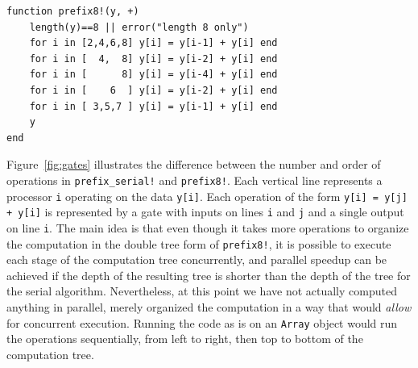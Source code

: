 \documentclass{sig-alternate}
\newcommand{\code}[1]{\texttt{#1}}
\begin{document}
\begin{verbatim}
function prefix8!(y, +)
    length(y)==8 || error("length 8 only")
    for i in [2,4,6,8] y[i] = y[i-1] + y[i] end
    for i in [  4,  8] y[i] = y[i-2] + y[i] end
    for i in [      8] y[i] = y[i-4] + y[i] end
    for i in [    6  ] y[i] = y[i-2] + y[i] end
    for i in [ 3,5,7 ] y[i] = y[i-1] + y[i] end
    y
end
\end{verbatim}

Figure~\ref{fig:gates} illustrates the difference between the number and order
of operations in \code{prefix\allowbreak\_serial!} and \code{prefix8!}. Each vertical line
represents a processor \code{i} operating on the data \code{y[i]}. Each
operation of the form \code{y[i] = y[j] + y[i]} is represented by a gate with
inputs on lines \code{i} and \code{j} and a single output on line \code{i}. The
main idea is that even though it takes more operations to organize the
computation in the double tree form of \code{prefix8!}, it is possible to
execute each stage of the computation tree concurrently, and parallel speedup
can be achieved if the depth of the resulting tree is shorter than the depth of
the tree for the serial algorithm. Nevertheless, at this point we have not
actually computed anything in parallel, merely organized the computation in a
way that would \textit{allow} for concurrent execution. Running the code as is
on an \code{Array} object would run the operations sequentially, from left to
right, then top to bottom of the computation tree. 
\end{document}
